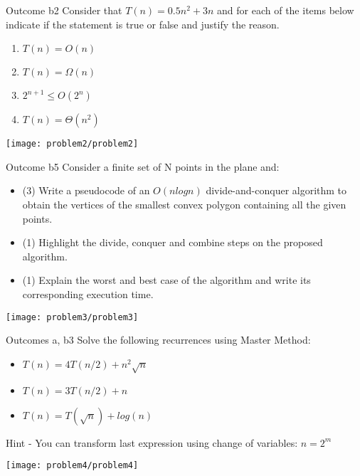 \begin{problem}{Outcome b}{2}
    Consider that $T(n) = 0.5n^2 + 3n$ and for each of the items below indicate if the statement is true or false and justify the reason. 

    \begin{enumerate}
        \item $T(n) = O(n)$
        \item $T(n) = \Omega(n)$
        \item $2^{n+1} \leq O(2^n)$
        \item $T(n) = \Theta(n^2)$
    \end{enumerate}

    \begin{center}
        \texttt{[image: problem2/problem2]}%
    \end{center}
\end{problem}

\begin{problem}{Outcome b}{5}
    Consider a finite set of N points in the plane and:
    \begin{itemize}
        \item (3) Write a pseudocode of an $O(nlogn)$ divide-and-conquer algorithm to obtain the vertices of the smallest convex polygon containing all the given points.
        \item (1) Highlight the divide, conquer and combine steps on the proposed algorithm.
        \item (1) Explain the worst and best case of the algorithm and write its corresponding execution time.
    \end{itemize}

    \begin{center}
        \texttt{[image: problem3/problem3]}%
    \end{center}
\end{problem}

\begin{problem}{Outcomes a, b}{3}
    Solve the following recurrences using Master Method:
    \begin{itemize}
        \item $T(n) = 4T(n/2) + n^2\sqrt{n}$
        \item $T(n) = 3T(n/2) + n$
        \item $T(n) = T(\sqrt{n}) + log(n)$
    \end{itemize}
    Hint - You can transform last expression using change of variables: $n = 2^m$
    \begin{center}
        \texttt{[image: problem4/problem4]}%
    \end{center}
\end{problem}


